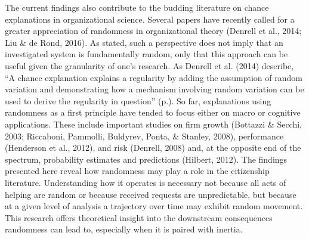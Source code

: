 \documentclass[english,,man]{apa6}
\begin{document}
The current findings also contribute to the budding literature on chance explanations in organizational science. Several papers have recently called for a greater appreciation of randomness in organizational theory (Denrell et al., 2014; Liu \& de Rond, 2016). As stated, such a perspective does not imply that an investigated system is fundamentally random, only that this approach can be useful given the granularity of one's research. As Denrell et al. (2014) describe, \enquote{A chance explanation explains a regularity by adding the assumption of random variation and demonstrating how a mechanism involving random variation can be used to derive the regularity in question} (p.). So far, explanations using randomness as a first principle have tended to focus either on macro or cognitive applications. These include important studies on firm growth (Bottazzi \& Secchi, 2003; Riccaboni, Pammolli, Buldyrev, Ponta, \& Stanley, 2008), performance (Henderson et al., 2012), and risk (Denrell, 2008) and, at the opposite end of the spectrum, probability estimates and predictions (Hilbert, 2012). The findings presented here reveal how randomness may play a role in the citizenship literature. Understanding how it operates is necessary not because all acts of helping are random or because received requests are unpredictable, but because at a given level of analysis a trajectory over time may exhibit random movement. This research offers theoretical insight into the downstream consequences randomness can lead to, especially when it is paired with inertia.
\end{document}
